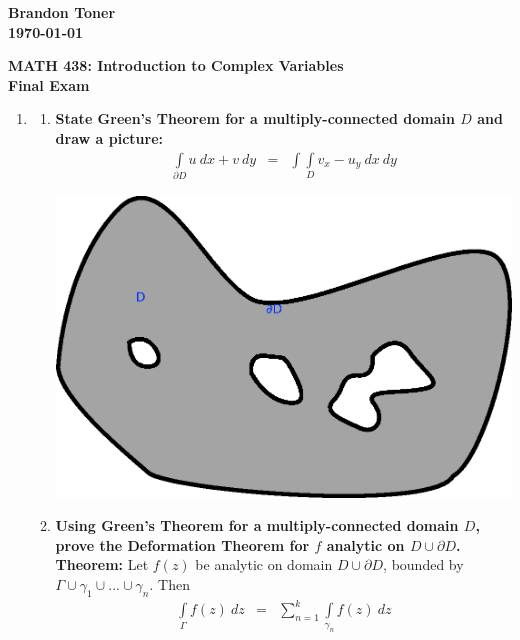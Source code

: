 \documentclass{article}%
\begin{document}
\begin{flushright}
\textbf{Brandon Toner \\
\today}
\end{flushright}

\begin{center}
\textbf{MATH 438: Introduction to Complex Variables \\
Final Exam} \\
\end{center}

\begin{enumerate}
    \item %
    \begin{enumerate}[label=\alph*)]
        \item %
        \textbf{State Green's Theorem for a multiply-connected domain $D$ and draw a picture:}
        \begin{eqnarray*}
            \int\limits_{\partial D} u~dx+ v~dy &=& \int\int\limits_{D} v_x - u_y~dx~dy
        \end{eqnarray*}
        \begin{center}
            \includegraphics[width=\textwidth]{images/greens.png}
        \end{center}
        \item %
        \textbf{Using Green's Theorem for a multiply-connected domain $D$, prove the Deformation Theorem for $f$ analytic on $D \cup \partial D$.} \\
        \textbf{Theorem: } Let $f(z)$ be analytic on domain $D \cup \partial D$, bounded by $\Gamma \cup \gamma_1 \cup ... \cup \gamma_n$. Then
        \begin{eqnarray*}
            \int\limits_{\Gamma}{f(z)~dz} &=& \sum\limits_{n=1}^k \int\limits_{\gamma_n}{f(z)~dz} \\

\end{eqnarray*}
\end{enumerate}
\end{enumerate}
\end{document}
